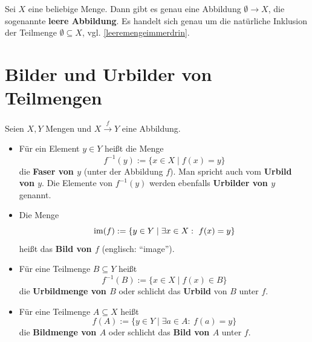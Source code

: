 \begin{de} 
    Sei $X$ eine beliebige Menge. Dann gibt es genau eine Abbildung $\emptyset\to X$, die sogenannte \textbf{leere Abbildung}. Es handelt sich genau um die natürliche Inklusion der Teilmenge $\emptyset\subseteq X$, vgl. \cref{leeremengeimmerdrin}.
\end{de}





\section{Bilder und Urbilder von Teilmengen}


\begin{de} \label{def:bildmenge}   
    Seien $X,Y$ Mengen und $X \xrightarrow{f} Y$ eine Abbildung.
    \begin{itemize}
        \item Für ein Element $y\in Y$ heißt die Menge
            \[ f^{-1}(y) := \{ x\in X \mid f(x)=y \} \]
        die \textbf{Faser von $y$} (unter der Abbildung $f$). Man spricht auch vom \textbf{Urbild von $y$}. Die Elemente von $f^{-1}(y)$ werden ebenfalls \textbf{Urbilder von $y$} genannt.
        \item Die Menge
            \[ \operatorname{im}(f) := \{y\in Y\mid \exists x\in X:\ f(x)=y  \} \]
        heißt das \textbf{Bild von $f$} (englisch: ``image'').
        \item Für eine Teilmenge $B\subseteq Y$ heißt
            \[ f^{-1}(B) := \{ x \in X \mid f(x)\in B \} \]
        die \textbf{Urbildmenge von $B$} oder schlicht das \textbf{Urbild} von $B$ unter $f$.
        \item Für eine Teilmenge $A\subseteq X$ heißt
            \[ f(A) := \{ y \in Y \mid \exists a\in A:\ f(a)=y \} \]
        die \textbf{Bildmenge von $A$} oder schlicht das \textbf{Bild von $A$} unter $f$. 
    \end{itemize}
\end{de}


